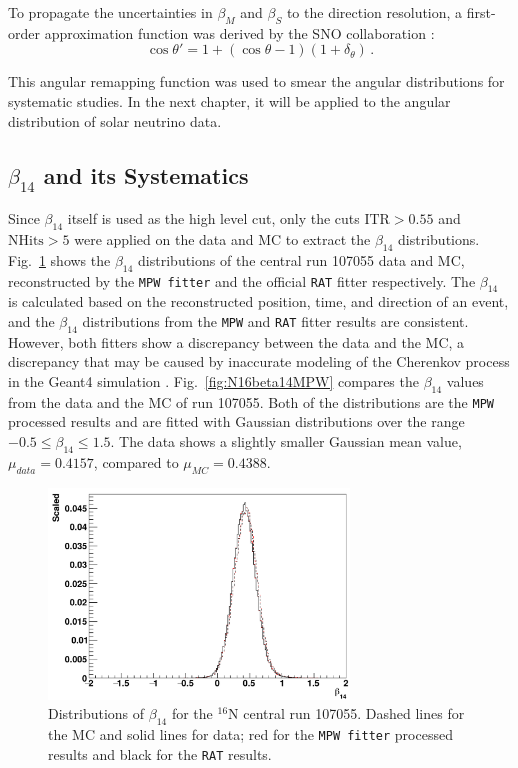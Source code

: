 To propagate the uncertainties in $\beta_M$ and $\beta_S$ to the direction resolution, a first-order approximation function was derived by the SNO collaboration \cite{drouin2012three}:
\begin{equation}\label{remapTheta}
\cos\theta'=1+(\cos\theta-1)(1+\delta_{\theta}) \, .
\end{equation}

This angular remapping function was used to smear the angular distributions for systematic studies. In the next chapter, it will be applied to the angular distribution of solar neutrino data. 

\subsection{$\beta_{14}$ and its Systematics} \label{sect:beta14Systematics}

Since $\beta_{14}$ itself is used as the high level cut, only the cuts $\mathrm{ITR}>0.55$ and $\mathrm{NHits}>5$ were applied on the data and MC to extract the $\beta_{14}$ distributions. Fig.~\ref{fig:N16beta14} shows the $\beta_{14}$ distributions of the central run 107055 data and MC, reconstructed by the \texttt{MPW fitter} and the official \texttt{RAT} fitter respectively. The $\beta_{14}$ is calculated based on the reconstructed position, time, and direction of an event, and the $\beta_{14}$ distributions from the \texttt{MPW} and \texttt{RAT} fitter results are consistent. However, both fitters show a discrepancy between the data and the MC, a discrepancy that may be caused by inaccurate modeling of the Cherenkov process in the Geant4 simulation \cite{dunmore2004separation,beta14discrepancy}. Fig.~\ref{fig:N16beta14MPW} compares the $\beta_{14}$ values from the data and the MC of run 107055. Both of the distributions are the \texttt{MPW} processed results and are fitted with Gaussian distributions over the range $-0.5 \le \beta_{14} \le 1.5$. The data shows a slightly smaller Gaussian mean value, $\mu_{data}=0.4157$, compared to $\mu_{MC}=0.4388$.

\begin{figure}[htbp]
	\centering
	\includegraphics[width=8cm]{N16_beta14_107055.png}
	\caption[Distributions of $\beta_{14}$ for the $^{16}$N central run 107055.]{Distributions of $\beta_{14}$ for the $^{16}$N central run 107055. Dashed lines for the MC and solid lines for data; red for the \texttt{MPW fitter} processed results and black for the \texttt{RAT} results. \label{fig:N16beta14}}
\end{figure}

